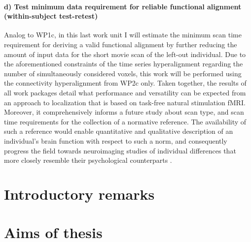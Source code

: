 \paragraph{d) Test minimum data requirement for reliable functional alignment
(within-subject test-retest)}
%
Analog to WP1c, in this last work unit I will estimate the minimum scan time
requirement for deriving a valid functional alignment by further reducing the
amount of input data for the short movie scan of the left-out individual.
%
Due to the aforementioned constraints of the time series hyperalignment
regarding the number of simultaneously considered voxels, this work will be
performed using the connectivity hyperalignment from WP2c only.
%
Taken together, the results of all work packages detail what performance and
versatility can be expected from an approach to localization that is based on
task-free natural stimulation fMRI.
%
Moreover, it comprehensively informs a future study about scan type, and scan
time requirements for the collection of a normative reference.
%
The availability of such a reference would enable quantitative and qualitative
description of an individual’s brain function with respect to such a norm, and
consequently progress the field towards neuroimaging studies of individual
differences that more closely resemble their psychological counterparts
\citep{dubois2016building}.


\section{Introductory remarks}


\section{Aims of thesis}


